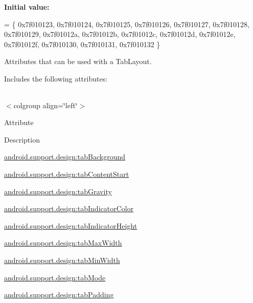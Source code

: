 {\bfseries Initial value\+:}
\begin{DoxyCode}
= \{
            0x7f010123, 0x7f010124, 0x7f010125, 0x7f010126,
            0x7f010127, 0x7f010128, 0x7f010129, 0x7f01012a,
            0x7f01012b, 0x7f01012c, 0x7f01012d, 0x7f01012e,
            0x7f01012f, 0x7f010130, 0x7f010131, 0x7f010132
        \}
\end{DoxyCode}
Attributes that can be used with a Tab\+Layout. 

Includes the following attributes\+:

\tabulinesep=1mm
\begin{longtabu} spread 0pt [c]{*{0}{|X[-1]}|}
\hline
\end{longtabu}
$<$colgroup align=\char`\"{}left\char`\"{}$>$ 

Attribute

Description 

{\ttfamily \hyperlink{classandroid_1_1support_1_1design_1_1R_1_1styleable_a520d2db5d68381c7d9477e52942fbdc4}{android.\+support.\+design\+:tab\+Background}}

{\ttfamily \hyperlink{classandroid_1_1support_1_1design_1_1R_1_1styleable_a45fca30d8fcae06a2922ea877aa726b2}{android.\+support.\+design\+:tab\+Content\+Start}}

{\ttfamily \hyperlink{classandroid_1_1support_1_1design_1_1R_1_1styleable_afba6408f9364ca3427b36d591ce6563f}{android.\+support.\+design\+:tab\+Gravity}}

{\ttfamily \hyperlink{classandroid_1_1support_1_1design_1_1R_1_1styleable_a8dfd23af824aaddd41960c0c43bae554}{android.\+support.\+design\+:tab\+Indicator\+Color}}

{\ttfamily \hyperlink{classandroid_1_1support_1_1design_1_1R_1_1styleable_a29ccf4ce74e5f86bb3d08031376f07ce}{android.\+support.\+design\+:tab\+Indicator\+Height}}

{\ttfamily \hyperlink{classandroid_1_1support_1_1design_1_1R_1_1styleable_af4f364340f303b8dbcdc26f58bd5fb41}{android.\+support.\+design\+:tab\+Max\+Width}}

{\ttfamily \hyperlink{classandroid_1_1support_1_1design_1_1R_1_1styleable_a5409f5cd527dbb046dbf6c0b239045f1}{android.\+support.\+design\+:tab\+Min\+Width}}

{\ttfamily \hyperlink{classandroid_1_1support_1_1design_1_1R_1_1styleable_a1792137b082bddced52c3c6742bc02f7}{android.\+support.\+design\+:tab\+Mode}}

{\ttfamily \hyperlink{classandroid_1_1support_1_1design_1_1R_1_1styleable_add60aab90e40a18e99ddd5db07708466}{android.\+support.\+design\+:tab\+Padding}}

